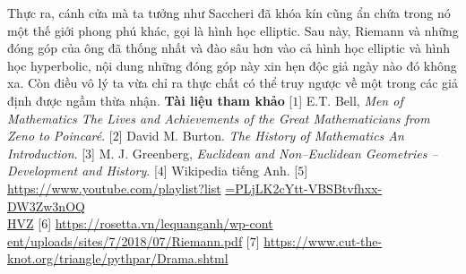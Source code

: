 \begin{multicols}{2}
	\vskip 0.1cm
	Thực ra, cánh cửa mà ta tưởng như Saccheri đã khóa kín cũng ẩn chứa trong nó một thế giới phong phú khác, gọi là hình học elliptic. Sau này, Riemann và những đóng góp của ông đã thống nhất và đào sâu hơn vào cả hình học elliptic và hình học hyperbolic, nội dung những đóng góp này xin hẹn độc giả ngày nào đó không xa. Còn điều vô lý ta vừa chỉ ra thực chất có thể truy ngược về một trong các giả định được ngầm thừa nhận.
	\vskip 0.1cm
	\textbf{Tài liệu tham khảo}
	\vskip 0.1cm
	[$1$] E.T.  Bell, \textit{Men of Mathematics The Lives and Achievements of the Great Mathematicians from Zeno to Poincaré}.   
	\vskip 0.1cm
	[$2$] David M. Burton. \textit{The History of Mathematics An Introduction}. 
	\vskip 0.1cm
	[$3$] M. J. Greenberg, \textit{Euclidean and Non--Euclidean Geometries -- Development and History}. 
	\vskip 0.1cm
	[$4$] Wikipedia tiếng Anh.
	\vskip 0.1cm
	[$5$] \url{https://www.youtube.com/playlist?list} \url{=PLjLK2cYtt-VBSBtvfhxx-DW3Zw3nOQ}\\
	\url{HVZ}  
	\vskip 0.1cm
	[$6$] \url{https://rosetta.vn/lequanganh/wp-cont}\\
	\url{ent/uploads/sites/7/2018/07/Riemann.pdf} 
	\vskip 0.1cm
	[$7$] \url{https://www.cut-the-knot.org/triangle/pythpar/Drama.shtml}
	\end{multicols}